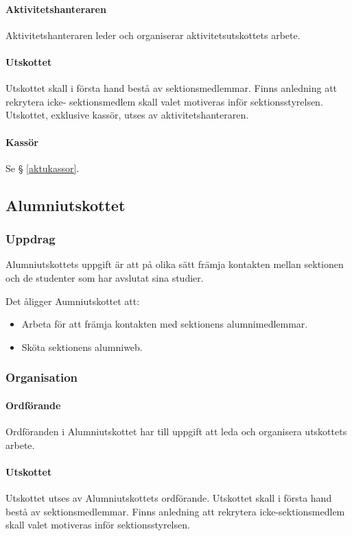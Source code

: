 \documentclass{datateknologsektionen-document}
\begin{document}
\paragraph{Aktivitetshanteraren}
Aktivitetshanteraren leder och organiserar aktivitetsutskottets arbete.
\paragraph{Utskottet}

Utskottet skall i första hand bestå av sektionsmedlemmar. Finns anledning att rekrytera icke-
sektionsmedlem skall valet motiveras inför sektionsstyrelsen. Utskottet, exklusive kassör,
utses av aktivitetshanteraren.
\paragraph{Kassör}
Se § \ref{aktukassor}.
\subsection{Alumniutskottet}
\label{alumni}
\subsubsection{Uppdrag}
Alumniutskottets uppgift är att på olika sätt främja kontakten mellan
sektionen och de studenter som har avslutat sina studier.

Det åligger Aumniutskottet att:
\begin{itemize}
  \item Arbeta för att främja kontakten med sektionens alumnimedlemmar.
  \item Sköta sektionens alumniweb.
\end{itemize}
\subsubsection{Organisation}
\paragraph{Ordförande}
Ordföranden i Alumniutskottet har till uppgift att leda och organisera utskottets arbete.
\paragraph{Utskottet}
Utskottet utses av Alumniutskottets ordförande. Utskottet skall i första hand bestå av
sektionsmedlemmar. Finns anledning att rekrytera icke-sektionsmedlem skall valet
motiveras inför sektionsstyrelsen.
\end{document}
